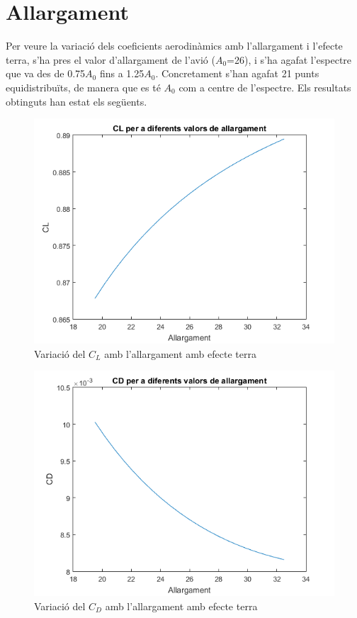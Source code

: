\section{Allargament}

Per veure la variació dels coeficients aerodinàmics amb l'allargament i l'efecte terra, s'ha pres el valor d'allargament de l'avió ($A_{0}$=26), i s'ha agafat l'espectre que va des de 0.75$A_{0}$ fins a 1.25$A_{0}$. Concretament s'han agafat 21 punts equidistribuïts, de manera que es té $A_{0}$ com a centre de l'espectre. Els resultats obtinguts han estat els següents.

\begin{figure}[H]
	\centering
	\includegraphics[scale=0.5]{./plots/CL_A}
	\caption{Variació del $C_{L}$ amb l'allargament amb efecte terra}
	\label{CL_A}
\end{figure}

\begin{figure}[H]
	\centering
	\includegraphics[scale=0.5]{./plots/CD_A}
	\caption{Variació del $C_{D}$ amb l'allargament amb efecte terra}
	\label{CD_A}
\end{figure}

